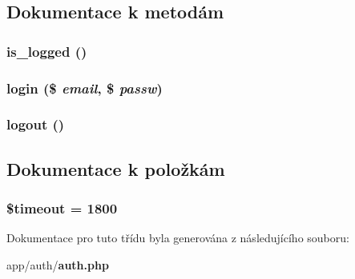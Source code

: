 \subsection{Dokumentace k metodám}
\subsubsection[{is\_\-logged}]{\setlength{\rightskip}{0pt plus 5cm}is\_\-logged ()}\label{dc/d6d/classauth__model_a38e6d54c77a25901e5d6b8f7f0c6f3f0}
\subsubsection[{login}]{\setlength{\rightskip}{0pt plus 5cm}login (\$ {\em email}, \/  \$ {\em passw})}\label{dc/d6d/classauth__model_acbe307e31c0a85cd886a3fdf8c1f6254}
\subsubsection[{logout}]{\setlength{\rightskip}{0pt plus 5cm}logout ()}\label{dc/d6d/classauth__model_a082405d89acd6835c3a7c7a08a7adbab}


\subsection{Dokumentace k položkám}
\subsubsection[{\$timeout}]{\setlength{\rightskip}{0pt plus 5cm}\$timeout = 1800\hspace{0.3cm}{\ttfamily  [private]}}\label{dc/d6d/classauth__model_a84320a9bf3e591d7ae20dfcb0dfe6a0d}


Dokumentace pro tuto třídu byla generována z následujícího souboru:\begin{DoxyCompactItemize}
\item 
app/auth/{\bf auth.php}\end{DoxyCompactItemize}

